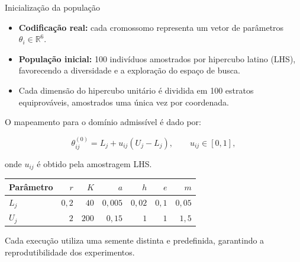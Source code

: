 \begin{frame}{Inicialização da população}

  \begin{itemize}
    \item \textbf{Codificação real:} cada cromossomo representa
          um vetor de parâmetros $\theta_i\in\mathbb{R}^{6}$.

    \item \textbf{População inicial:} 100 indivíduos amostrados
          por hipercubo latino (LHS), favorecendo a diversidade
          e a exploração do espaço de busca.

    \item Cada dimensão do hipercubo unitário é dividida em
          100 estratos equiprováveis, amostrados uma única vez
          por coordenada.
  \end{itemize}

  O mapeamento para o domínio admissível é dado por:

  \[
    \theta_{ij}^{(0)}=L_j+u_{ij}(U_j-L_j),
    \qquad u_{ij}\in[0,1],
  \]

  onde $u_{ij}$ é obtido pela amostragem LHS.

  \begin{table}
    \centering
    \begin{tabular}{lrrrrrr}
      \toprule
      Parâmetro & $r$ & $K$ & $a$ & $h$ & $e$ & $m$ \\
      \midrule
      $L_j$ & $0{,}2$ & $40$ & $0{,}005$ & $0{,}02$ & $0{,}1$ & $0{,}05$ \\
      $U_j$ & $2$ & $200$ & $0{,}15$ & $1$ & $1$ & $1{,}5$ \\
      \bottomrule
    \end{tabular}
  \end{table}

  \small
  Cada execução utiliza uma semente distinta e predefinida,
  garantindo a reprodutibilidade dos experimentos.

\end{frame}

